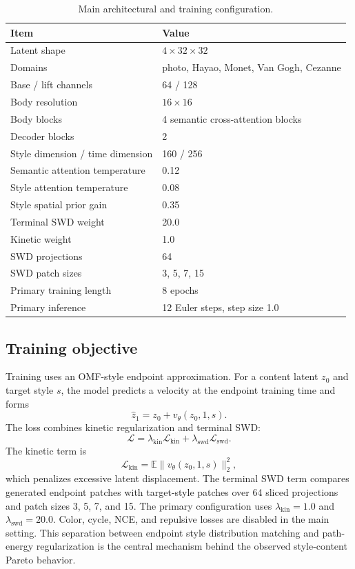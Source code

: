 ﻿\documentclass{article}
\begin{document}
\begin{table}[t]
\centering
\caption{Main architectural and training configuration.}
\label{tab:config}
\begin{tabular}{ll}
\toprule
Item & Value \\
\midrule
Latent shape & $4 \times 32 \times 32$ \\
Domains & photo, Hayao, Monet, Van Gogh, Cezanne \\
Base / lift channels & 64 / 128 \\
Body resolution & $16 \times 16$ \\
Body blocks & 4 semantic cross-attention blocks \\
Decoder blocks & 2 \\
Style dimension / time dimension & 160 / 256 \\
Semantic attention temperature & 0.12 \\
Style attention temperature & 0.08 \\
Style spatial prior gain & 0.35 \\
Terminal SWD weight & 20.0 \\
Kinetic weight & 1.0 \\
SWD projections & 64 \\
SWD patch sizes & 3, 5, 7, 15 \\
Primary training length & 8 epochs \\
Primary inference & 12 Euler steps, step size 1.0 \\
\bottomrule
\end{tabular}
\end{table}

\subsection{Training objective}
Training uses an OMF-style endpoint approximation. For a content latent $z_0$ and target style $s$, the model predicts a velocity at the endpoint training time and forms
\begin{equation}
    \hat{z}_1 = z_0 + v_\theta(z_0,1,s).
\end{equation}
The loss combines kinetic regularization and terminal SWD:
\begin{equation}
    \mathcal{L} = \lambda_{\mathrm{kin}}\mathcal{L}_{\mathrm{kin}} + \lambda_{\mathrm{swd}}\mathcal{L}_{\mathrm{swd}}.
\end{equation}
The kinetic term is
\begin{equation}
    \mathcal{L}_{\mathrm{kin}} = \mathbb{E}\|v_\theta(z_0,1,s)\|_2^2,
\end{equation}
which penalizes excessive latent displacement. The terminal SWD term compares generated endpoint patches with target-style patches over 64 sliced projections and patch sizes 3, 5, 7, and 15. The primary configuration uses $\lambda_{\mathrm{kin}}=1.0$ and $\lambda_{\mathrm{swd}}=20.0$. Color, cycle, NCE, and repulsive losses are disabled in the main setting. This separation between endpoint style distribution matching and path-energy regularization is the central mechanism behind the observed style-content Pareto behavior.
\end{document}
